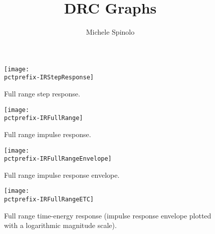 \documentclass[a4paper,titlepage]{article}
\title{DRC Graphs}
\author{Michele Spinolo}
\newcommand{\pctprefix}{T}
\newcommand{\pctwidth}{1.0}
\begin{document}
\begin{titlepage}
\maketitle\thispagestyle{empty}
\end{titlepage}

\clearpage
\listoffigures 


\clearpage

\begin{figure}
\begin{minipage}{\textwidth}
\begin{center}
\texttt{[image: \\pctprefix-IRStepResponse]}
\caption{Full range step response.} 
\end{center}
\end{minipage}

\begin{minipage}{\textwidth}
\begin{center}
\texttt{[image: \\pctprefix-IRFullRange]}
\caption{Full range impulse  response.}
\end{center}
\end{minipage}
\end{figure}

\clearpage

\begin{figure}
\begin{minipage}{\textwidth}
\begin{center}
\texttt{[image: \\pctprefix-IRFullRangeEnvelope]}
\caption{Full range impulse  response  envelope.}
\end{center}
\end{minipage}

\begin{minipage}{\textwidth}
\begin{center}
\texttt{[image: \\pctprefix-IRFullRangeETC]}
\caption{Full range time-energy response (impulse  response envelope plotted with a
logarithmic magnitude scale).}
\end{center}
\end{minipage}
\end{figure}

\clearpage

\end{document}
